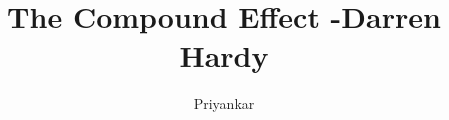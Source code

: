\documentclass{notestyle}
\title{The Compound Effect -Darren Hardy}
\author{Priyankar}
\begin{document}
\maketitle
\tableofcontents
\clearpage









\nocite{*}
\end{document}

